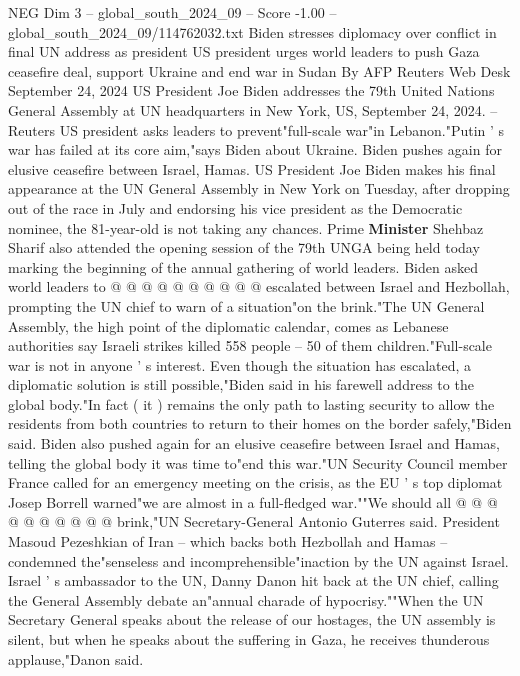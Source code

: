 \begin{textsample}{NEG Dim 3 – global\_south\_2024\_09 – Score -1.00 – global\_south\_2024\_09/114762032.txt}  \label{ex:f3_neg_121}
Biden stresses diplomacy over conflict in final UN address as president US president urges world leaders to push Gaza ceasefire deal, support Ukraine and end war in Sudan By AFP Reuters Web Desk September 24, 2024 US President Joe Biden addresses the 79th United Nations General Assembly at UN headquarters in New York, US, September 24, 2024. -- Reuters US president asks leaders to prevent"full-scale war"in Lebanon."Putin ' s war has failed at its core aim,"says Biden about Ukraine.
Biden pushes again for elusive ceasefire between Israel, Hamas.
US President Joe Biden makes his final appearance at the UN General Assembly in New York on Tuesday, after dropping out of the race in July and endorsing his vice president as the Democratic nominee, the 81-year-old is not taking any chances.
Prime \textbf{Minister} Shehbaz Sharif also attended the opening session of the 79th UNGA being held today marking the beginning of the annual gathering of world leaders.
Biden asked world leaders to @ @ @ @ @ @ @ @ @ @ escalated between Israel and Hezbollah, prompting the UN chief to warn of a situation"on the brink."The UN General Assembly, the high point of the diplomatic calendar, comes as Lebanese authorities say Israeli strikes killed 558 people -- 50 of them children."Full-scale war is not in anyone ' s interest.
Even though the situation has escalated, a diplomatic solution is still possible,"Biden said in his farewell address to the global body."In fact ( it ) remains the only path to lasting security to allow the residents from both countries to return to their homes on the border safely,"Biden said.
Biden also pushed again for an elusive ceasefire between Israel and Hamas, telling the global body it was time to"end this war."UN Security Council member France called for an emergency meeting on the crisis, as the EU ' s top diplomat Josep Borrell warned"we are almost in a full-fledged war.""We should all @ @ @ @ @ @ @ @ @ @ brink,"UN Secretary-General Antonio Guterres said.
President Masoud Pezeshkian of Iran -- which backs both Hezbollah and Hamas -- condemned the"senseless and incomprehensible"inaction by the UN against Israel.
Israel ' s ambassador to the UN, Danny Danon hit back at the UN chief, calling the General Assembly debate an"annual charade of hypocrisy.""When the UN Secretary General speaks about the release of our hostages, the UN assembly is silent, but when he speaks about the suffering in Gaza, he receives thunderous applause,"Danon said.

\end{textsample}
